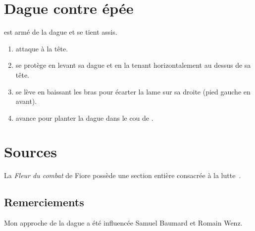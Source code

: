 \section{Dague contre épée}


\begin{technique}

	\D est armé de la dague et se tient assis.

	\begin{enumerate}
		\item \A attaque à la tête.
		
		\item \D se protège en levant sa dague et en la tenant horizontalement au dessus de sa tête.
		
		\item \D se lève en baissant les bras pour écarter la lame sur sa droite (pied gauche en avant).
		
		\item \D avance pour planter la dague dans le cou de \D.
	\end{enumerate}
\end{technique}


\section{Sources}


La \emph{Fleur du combat} de Fiore possède une section entière consacrée à la lutte~\cite{deiLiberi:Conan:2014:FleurCombat:Dague}.


\subsection*{Remerciements}


Mon approche de la dague a été influencée Samuel Baumard et Romain Wenz.

